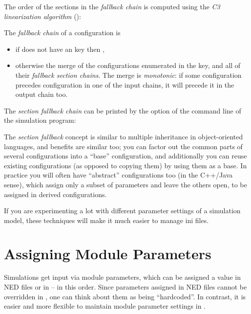 The order of the sections in the \textit{fallback chain} is computed
using the \textit{C3 linearization algorithm} (\cite{Barrett1996}):

The \textit{fallback chain} of a configuration  is
\begin{itemize}
  \item{if  does not have an  key then
        , }
  \item{otherwise the merge of the configurations enumerated in
        the  key, and all of their
        \textit{fallback section chains}.
        The merge is \textit{monotonic}: if some configuration 
        precedes configuration  in one of the input chains,
        it will precede it in the output chain too. }
\end{itemize}

The \textit{section fallback chain} can be printed by the  option
of the command line of the simulation program:


The \textit{section fallback} concept is similar to multiple inheritance in
object-oriented languages, and benefits are similar too; you can factor out
the common parts of several configurations into a ``base'' configuration,
and additionally you can reuse existing configurations (as opposed to
copying them) by using them as a base. In practice you will often have
``abstract'' configurations too (in the C++/Java sense), which assign only
a subset of parameters and leave the others open, to be assigned in derived
configurations.

If you are experimenting a lot with different parameter settings of a
simulation model, these techniques will make it much easier to manage
ini files.

\section{Assigning Module Parameters}
\label{sec:ch-config-sim:parameter-settings}

Simulations get input via module parameters, which can be assigned a
value in NED files or in  -- in this order. Since parameters
assigned in NED files cannot be overridden in , one can
think about them as being ``hardcoded''. In contrast, it is easier
and more flexible to maintain module parameter settings in .

